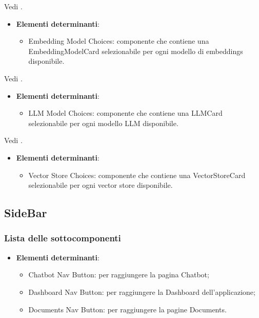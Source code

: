\documentclass[10pt, a4paper]{article}
\begin{document}
Vedi .


\label{EmbeddingModelInitDettaglio}
\begin{itemize}
    \item \textbf{Elementi determinanti}:
     \begin{itemize}
        \item Embedding Model Choices: componente che contiene una EmbeddingModelCard selezionabile per ogni modello di embeddings disponibile.
    \end{itemize}
\end{itemize}



Vedi .

\label{LLMModelInitDettaglio}
\begin{itemize}
    \item \textbf{Elementi determinanti}:
     \begin{itemize}
        \item LLM Model Choices: componente che contiene una LLMCard selezionabile per ogni modello LLM disponibile.
    \end{itemize}
\end{itemize}


Vedi .

\label{VectorStoreInitDettaglio}
\begin{itemize}
    \item \textbf{Elementi determinanti}:
     \begin{itemize}
        \item Vector Store Choices: componente che contiene una VectorStoreCard selezionabile per ogni vector store disponibile.
    \end{itemize}
\end{itemize}


\subsection{SideBar}
\subsubsection{Lista delle sottocomponenti}

\label{NavigationMenuDettaglio}
\begin{itemize}
    \item \textbf{Elementi determinanti}:
     \begin{itemize}
        \item Chatbot Nav Button: per raggiungere la pagina Chatbot;
        \item Dashboard Nav Button: per raggiungere la Dashboard dell'applicazione;
        \item Documents Nav Button: per raggiungere la pagine Documents.
    \end{itemize}
\end{itemize}
\end{document}
